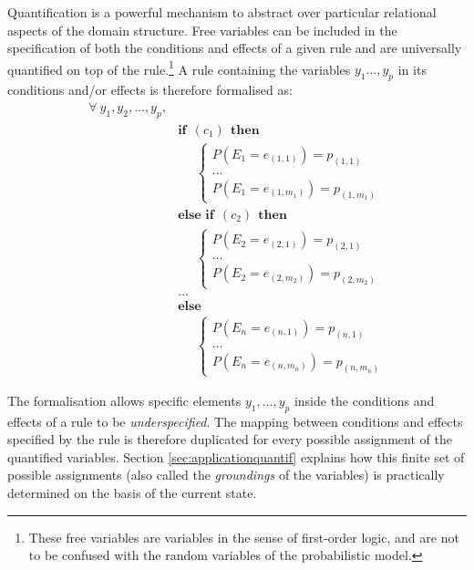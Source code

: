 Quantification is a powerful mechanism to abstract over particular relational aspects of the domain structure.  Free variables can be included in the specification of both the conditions and effects of a given rule and are universally quantified on top of the rule.\footnote{These free variables are variables in the sense of first-order logic, and are not to be confused with the random variables of the probabilistic model.}  A rule containing the variables $y_1 \dots, y_p$ in its conditions and/or effects is therefore formalised as:
\begin{equation}
\begin{aligned}
\forall \ y_1, y_2, \dots, y_p, \\
& \textbf{if} \ \ (c_{1}) \ \ \textbf{then} \\ 
& \;\;\;\;\; \begin{cases}
P(E_1\!=\!e_{(1,1)}) = p_{(1,1)} \\
 \dots \\
P(E_1\!=\!e_{(1,m_1)}) = p_{(1,m_1)} 
\end{cases} \\[3mm]
& \textbf{else if} \ \ (c_{2}) \ \ \textbf{then} \\ 
& \;\;\;\;\; \begin{cases}
P(E_2\!=\!e_{(2,1)}) = p_{(2,1)} \\
 \dots \\
P(E_2\!=\!e_{(2,m_2)}) = p_{(2,m_2)} 
\end{cases} \\ 
&  \dots  \\
& \textbf{else} \\
& \;\;\;\;\; \begin{cases}
P(E_n\!=\!e_{(n,1)}) = p_{(n,1)} \\
 \dots \\
P(E_n\!=\!e_{(n,m_n)}) = p_{(n,m_n)}
\end{cases}
\end{aligned}
\label{eq:rulewithquant}
\end{equation}

The formalisation allows specific elements $y_1, \dots, y_p$ inside the conditions and effects of a rule to be \textit{underspecified}.  The mapping between conditions and effects specified by the rule is therefore duplicated for every possible assignment of the quantified variables.  Section \ref{sec:applicationquantif} explains how this finite set of possible assignments (also called the \textit{groundings} of the variables) is practically determined on the basis of the current state. 

